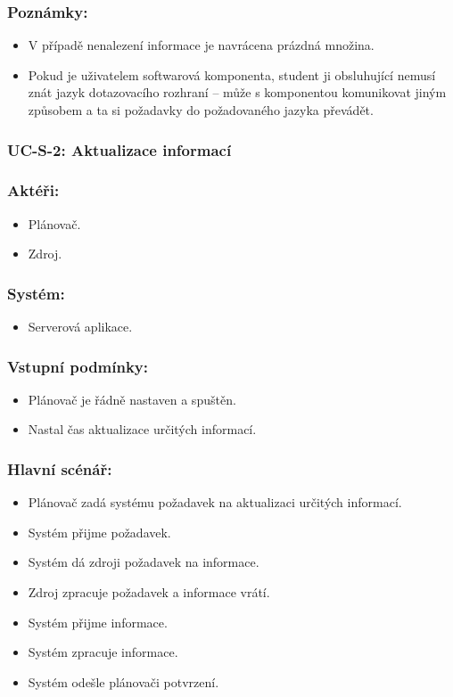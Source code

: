 \subsubsection*{Poznámky:}
\begin{itemize}
 \item V případě nenalezení informace je navrácena prázdná množina.
 \item Pokud je uživatelem softwarová komponenta, student ji obsluhující nemusí znát jazyk dotazovacího rozhraní -- může s komponentou komunikovat jiným způsobem a ta si požadavky do požadovaného jazyka převádět.
\end{itemize}

\subsubsection{UC-S-2: Aktualizace informací}
\subsubsection*{Aktéři:}
\begin{itemize}
 \item Plánovač.
 \item Zdroj.
\end{itemize}
\subsubsection*{Systém:}
\begin{itemize}
 \item Serverová aplikace.
\end{itemize}
\subsubsection*{Vstupní podmínky:}
\begin{itemize}
 \item Plánovač je řádně nastaven a spuštěn.
 \item Nastal čas aktualizace určitých informací.
\end{itemize}
\subsubsection*{Hlavní scénář:}
\begin{itemize}
 \item Plánovač zadá systému požadavek na aktualizaci určitých informací.
 \item Systém přijme požadavek.
 \item Systém dá zdroji požadavek na informace.
 \item Zdroj zpracuje požadavek a informace vrátí.
 \item Systém přijme informace.
 \item Systém zpracuje informace.
 \item Systém odešle plánovači potvrzení.
\end{itemize}
